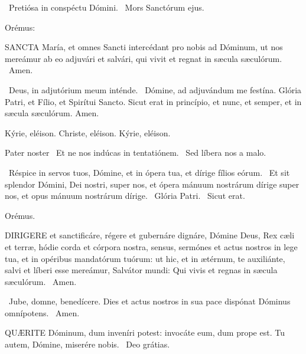 
\V\ Pretiósa in conspéctu Dómini. \R\ Mors Sanctórum ejus.

 Orémus:


\lettrine[lines=2]{S}{ANCTA} María, et omnes Sancti intercédant pro nobis ad Dóminum, ut nos mereámur ab eo adjuvári et salvári, qui vivit et regnat in sæcula sæculórum. \R\ Amen.

\V\ Deus, in adjutórium meum inténde. \R\ Dómine, ad adjuvándum me festína.  Glória Patri, et Fílio, et Spirítui Sancto. Sicut erat in princípio, et nunc, et semper, et in sæcula sæculórum. Amen.

Kýrie, eléison. Christe, eléison. Kýrie, eléison.

Pater noster  \V\ Et ne nos indúcas in tentatiónem. \R\ Sed líbera nos a malo.

\V\ Réspice in servos tuos, Dómine, et in ópera tua, et dírige fílios eórum. \R\ Et sit splendor Dómini, Dei nostri, super nos, et ópera mánuum nostrárum dírige super nos, et opus mánuum nostrárum dírige. \V\ Glória Patri. \R\ Sicut erat.

Orémus. 

\lettrine[lines=2]{D}{IRIGERE} et sanctificáre, régere et gubernáre dignáre, Dómine Deus, Rex cæli et terræ, hódie corda et córpora nostra, sensus, sermónes et actus nostros in lege tua, et in opéribus mandatórum tuórum: ut hic, et in ætérnum, te auxiliánte, salvi et líberi esse mereámur, Salvátor mundi: Qui vivis et regnas in sæcula sæculórum. \R\ Amen.


\V\ Jube, domne, benedícere.  Dies et actus nostros in sua pace dispónat Dóminus omnípotens. \R\ Amen.




\lettrine[lines=2]{Q}{UÆRITE} Dóminum, dum inveníri potest: invocáte eum, dum prope est. Tu autem, Dómine, miserére nobis. \R\ Deo grátias.

